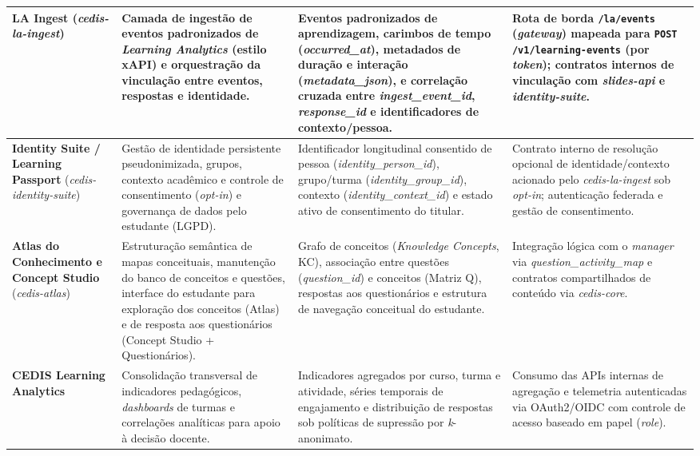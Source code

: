 {\begin{longtable}{>{\raggedright\arraybackslash}p{2.6cm}>{\raggedright\arraybackslash}p{3.4cm}>{\raggedright\arraybackslash}p{4.3cm}>{\raggedright\arraybackslash}p{3.5cm}}
\hline
\textbf{LA Ingest} (\textit{cedis-la-ingest}) & Camada de ingestão de eventos padronizados de \textit{Learning Analytics} (estilo xAPI) e orquestração da vinculação entre eventos, respostas e identidade. & Eventos padronizados de aprendizagem, carimbos de tempo (\textit{occurred\_at}), metadados de duração e interação (\textit{metadata\_json}), e correlação cruzada entre \textit{ingest\_event\_id}, \textit{response\_id} e identificadores de contexto/pessoa. & Rota de borda \texttt{/la/events} (\textit{gateway}) mapeada para \texttt{POST} \texttt{/v1/learning-\allowbreak events} (por \textit{token}); contratos internos de vinculação com \textit{slides-api} e \textit{identity-suite}. \\
\hline
\textbf{Identity Suite / Learning Passport} (\textit{cedis-identity-\allowbreak suite}) & Gestão de identidade persistente pseudonimizada, grupos, contexto acadêmico e controle de consentimento (\textit{opt-in}) e governança de dados pelo estudante (LGPD). & Identificador longitudinal consentido de pessoa (\textit{identity\_person\_id}), grupo/turma (\textit{identity\_group\_id}), contexto (\textit{identity\_context\_id}) e estado ativo de consentimento do titular. & Contrato interno de resolução opcional de identidade/contexto acionado pelo \textit{cedis-la-ingest} sob \textit{opt-in}; autenticação federada e gestão de consentimento. \\
\hline
\textbf{Atlas do Conhecimento e Concept Studio} (\textit{cedis-atlas}) & Estruturação semântica de mapas conceituais, manutenção do banco de conceitos e questões, interface do estudante para exploração dos conceitos (Atlas) e de resposta aos questionários (Concept Studio + Questionários). & Grafo de conceitos (\textit{Knowledge Concepts}, KC), associação entre questões (\textit{question\_id}) e conceitos (Matriz Q), respostas aos questionários e estrutura de navegação conceitual do estudante. & Integração lógica com o \textit{manager} via \textit{question\_\allowbreak activity\_map} e contratos compartilhados de conteúdo via \textit{cedis-core}. \\
\hline
\textbf{CEDIS Learning Analytics} & Consolidação transversal de indicadores pedagógicos, \textit{dashboards} de turmas e correlações analíticas para apoio à decisão docente. & Indicadores agregados por curso, turma e atividade, séries temporais de engajamento e distribuição de respostas sob políticas de supressão por \textit{k}-anonimato. & Consumo das APIs internas de agregação e telemetria autenticadas via OAuth2/OIDC com controle de acesso baseado em papel (\textit{role}). \\

\end{longtable}}
